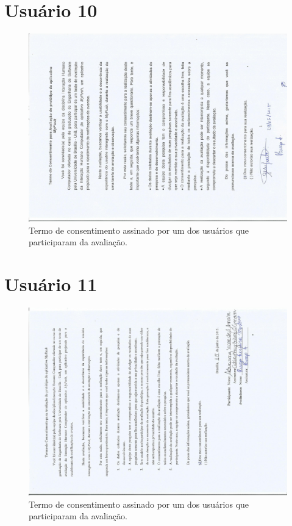 \begin{anexosenv}
      \section*{Usuário 10}
    \begin{figure}[!htbp]
      \centering
      \includegraphics[scale=0.6, angle=-90]{editaveis/figuras/gesiel}
      \caption{Termo de consentimento assinado por um dos usuários que participaram da avaliação.}
      \label{termo_consentimento_1}
    \end{figure}
    \pagebreak
    
     \section*{Usuário 11}
    \begin{figure}[!htbp]
      \centering
      \includegraphics[scale=0.6, angle=-90]{editaveis/figuras/adrianny}
      \caption{Termo de consentimento assinado por um dos usuários que participaram da avaliação.}
      \label{termo_consentimento_1}
    \end{figure}
    \pagebreak
	

\end{anexosenv}
